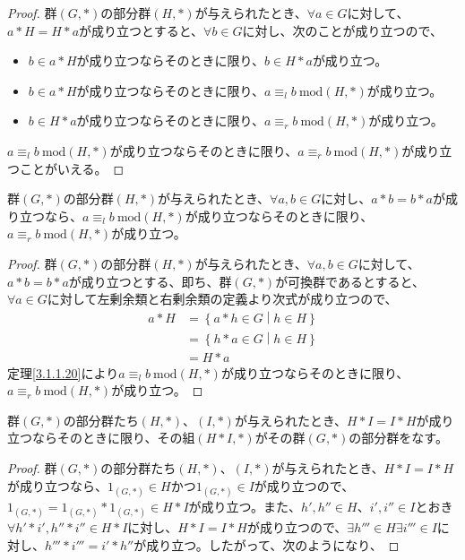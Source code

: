 \documentclass[dvipdfmx]{jsarticle}
\begin{document}
\begin{dfn}
\begin{proof}
群$(G,*)$の部分群$(H,*)$が与えられたとき、$\forall a \in G$に対して、$a*H = H*a$が成り立つとすると、$\forall b \in G$に対し、次のことが成り立つので、
\begin{itemize}
\item
  $b \in a*H$が成り立つならそのときに限り、$b \in H*a$が成り立つ。
\item
  $b \in a*H$が成り立つならそのときに限り、$a \equiv_{l}b\ \mathrm{mod}(H,*)$が成り立つ。
\item
  $b \in H*a$が成り立つならそのときに限り、$a \equiv_{r}b\ \mathrm{mod}(H,*)$が成り立つ。
\end{itemize}
$a \equiv_{l}b\ \mathrm{mod}(H,*)$が成り立つならそのときに限り、$a \equiv_{r}b\ \mathrm{mod}(H,*)$が成り立つことがいえる。
\end{proof}
\begin{thm}\label{3.1.1.21}
群$(G,*)$の部分群$(H,*)$が与えられたとき、$\forall a,b \in G$に対し、$a*b = b*a$が成り立つなら、$a \equiv_{l}b\ \mathrm{mod}(H,*)$が成り立つならそのときに限り、$a \equiv_{r}b\ \mathrm{mod}(H,*)$が成り立つ。
\end{thm}
\begin{proof}
群$(G,*)$の部分群$(H,*)$が与えられたとき、$\forall a,b \in G$に対して、$a*b = b*a$が成り立つとする、即ち、群$(G,*)$が可換群であるとすると、$\forall a \in G$に対して左剰余類と右剰余類の定義より次式が成り立つので、
\begin{align*}
a*H &= \left\{ a*h \in G \middle| h \in H \right\}\\
&= \left\{ h*a \in G \middle| h \in H \right\}\\
&= H*a
\end{align*}
定理\ref{3.1.1.20}により$a \equiv_{l}b\ \mathrm{mod}(H,*)$が成り立つならそのときに限り、$a \equiv_{r}b\ \mathrm{mod}(H,*)$が成り立つ。
\end{proof}
\begin{thm}\label{3.1.1.22}
群$(G,*)$の部分群たち$(H,*)$、$(I,*)$が与えられたとき、$H*I = I*H$が成り立つならそのときに限り、その組$(H*I,*)$がその群$(G,*)$の部分群をなす。
\end{thm}
\begin{proof}
群$(G,*)$の部分群たち$(H,*)$、$(I,*)$が与えられたとき、$H*I = I*H$が成り立つなら、$1_{(G,*)} \in H$かつ$1_{(G,*)} \in I$が成り立つので、$1_{(G,*)} = 1_{(G,*)}*1_{(G,*)} \in H*I$が成り立つ。また、$h',h'' \in H$、$i',i'' \in I$とおき$\forall h'*i',h''*i'' \in H*I$に対し、$H*I = I*H$が成り立つので、$\exists h''' \in H\exists i''' \in I$に対し、$h'''*i''' = i'*h''$が成り立つ。したがって、次のようになり、

\end{proof}
\end{dfn}
\end{document}
